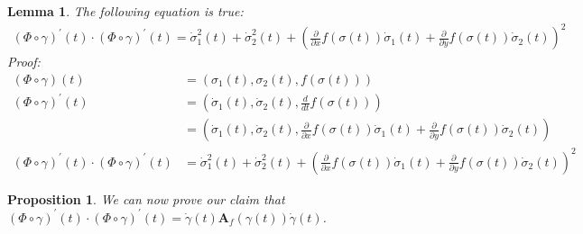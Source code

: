 \documentclass[12pt]{article}
\newtheorem{lemma}[theorem]{Lemma}
\newtheorem{proposition}{Proposition}
\begin{document}
	\begin{lemma}
		\label{lemma:claim_LHS}
		The following equation is true:
		\begin{align}
			(\Phi \circ \gamma)^{\prime}(t) \cdot (\Phi \circ \gamma)^{\prime}(t) = \dot \sigma^{2}_1(t) + \dot \sigma^{2}_2(t) + (\frac{\partial}{\partial x}f(\sigma(t))\dot \sigma_1(t) + \frac{\partial}{\partial y}f(\sigma(t))\dot \sigma_2(t))^2
		\end{align}
		Proof:
		\begin{align}
			(\Phi \circ \gamma)(t) &= (\sigma_1(t), \sigma_2(t), f(\sigma(t))) \\
			(\Phi \circ \gamma)^{\prime}(t) &= (\dot \sigma_1(t), \dot \sigma_2(t), \frac{d}{dt}f(\sigma(t))) \\
			&= (\dot \sigma_1(t), \dot \sigma_2(t), \frac{\partial}{\partial x}f(\sigma(t))\dot \sigma_1(t) + \frac{\partial}{\partial y}f(\sigma(t))\dot \sigma_2(t)) \\
			(\Phi \circ \gamma)^{\prime}(t) \cdot (\Phi \circ \gamma)^{\prime}(t) &= \dot \sigma^{2}_1(t) + \dot \sigma^{2}_2(t) + (\frac{\partial}{\partial x}f(\sigma(t))\dot \sigma_1(t) + \frac{\partial}{\partial y}f(\sigma(t))\dot \sigma_2(t))^2
		\end{align}
	\end{lemma}
	
	\begin{proposition}
		We can now prove our claim that $(\Phi \circ \gamma)^{\prime}(t) \cdot (\Phi \circ \gamma)^{\prime}(t) = \dot \gamma(t) \bm{A}_f(\gamma(t)) \dot \gamma(t)$.
	\end{proposition}
	
\end{document}
